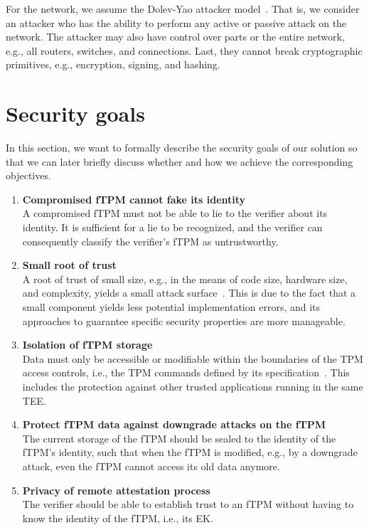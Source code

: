 For the network, we assume the Dolev-Yao attacker model~\cite{Dolev1983}.
That is, we consider an attacker who has the ability to perform any active or passive attack on the network.
The attacker may also have control over parts or the entire network, e.g., all routers, switches, and connections.
Last, they cannot break cryptographic primitives, e.g., encryption, signing, and hashing.

\section{Security goals}

In this section, we want to formally describe the security goals of our solution so that we can later briefly discuss whether and how we achieve the corresponding objectives.

\begin{enumerate}[label=\textbf{SG-\arabic*}]
  \item{\textbf{Compromised fTPM cannot fake its identity}\\
  A compromised fTPM must not be able to lie to the verifier about its identity.
  It is sufficient for a lie to be recognized, and the verifier can consequently classify the verifier's fTPM as untrustworthy.}\label{sg:1}

  \item{\textbf{Small root of trust}\\
  A root of trust of small size, e.g., in the means of code size, hardware size, and complexity, yields a small attack surface~\cite{Singaravelu2006}.
  This is due to the fact that a small component yields less potential implementation errors, and its approaches to guarantee specific security properties are more manageable.}\label{sg:2}
  
  \item{\textbf{Isolation of fTPM storage}\\
  Data must only be accessible or modifiable within the boundaries of the TPM access controls, i.e., the TPM commands defined by its specification~\cite{tpm20}.
  This includes the protection against other trusted applications running in the same \ac{TEE}\@.}\label{sg:3}
  
  \item{\textbf{Protect fTPM data against downgrade attacks on the fTPM}\\
  The current storage of the fTPM should be sealed to the identity of the fTPM's identity, such that when the fTPM is modified, e.g., by a downgrade attack, even the fTPM cannot access its old data anymore.}\label{sg:4}

  \item{\textbf{Privacy of remote attestation process}\\
  The verifier should be able to establish trust to an fTPM without having to know the identity of the fTPM, i.e., its EK\@.}\label{sg:5}
\end{enumerate}

